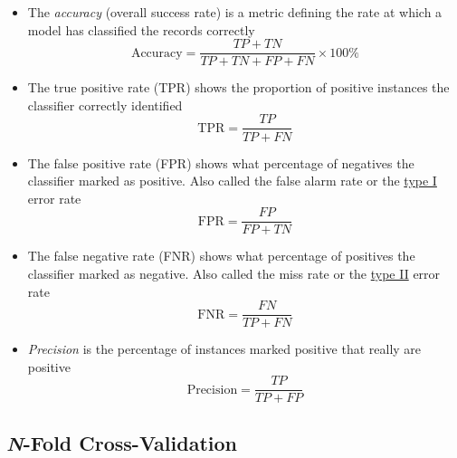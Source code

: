 \documentclass{article}
\begin{document}
\begin{itemize}
    \item The \textit{accuracy} (overall success rate) is a metric defining the rate at which a model has classified the records correctly
    $$\text{Accuracy} = \frac{TP + TN}{TP+TN+FP+FN} \times 100\%$$
    \item The true positive rate (TPR) shows the proportion of positive instances the classifier correctly identified
    $$\text{TPR} = \frac{TP}{TP+FN}$$
    \item The false positive rate (FPR) shows what percentage of negatives the classifier marked as positive. Also called the false alarm rate or the \underline{type I} error rate
    $$\text{FPR} = \frac{FP}{FP+TN}$$
    \item The false negative rate (FNR) shows what percentage of positives the classifier marked as negative. Also called the miss rate or the \underline{type II} error rate
    $$\text{FNR} = \frac{FN}{TP+FN}$$
    \item \textit{Precision} is the percentage of instances marked positive that really are positive
    $$\text{Precision} = \frac{TP}{TP+FP}$$
\end{itemize}

\subsection{\textit{N}-Fold Cross-Validation}
\end{document}
